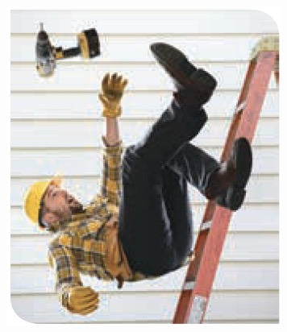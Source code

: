 \documentclass[11pt]{book}
\begin{document}
\begin{minipage}[t]{0.35\textwidth}
\begin{figure}[H]
        \includegraphics[width=\linewidth]{f_gravitacional}
        \label{fig:f_gravitacional}
    \end{figure}
\end{minipage}\hfill
\end{document}
